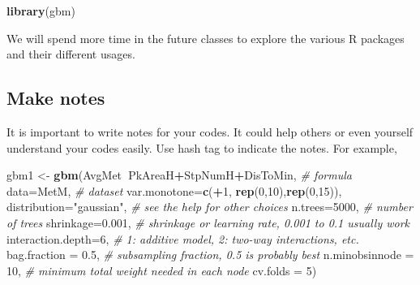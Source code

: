 \documentclass[]{book}
\newenvironment{Shaded}{\begin{snugshade}}{\end{snugshade}}
\newcommand{\CommentTok}[1]{\textcolor[rgb]{0.56,0.35,0.01}{\textit{#1}}}
\newcommand{\DataTypeTok}[1]{\textcolor[rgb]{0.13,0.29,0.53}{#1}}
\newcommand{\DecValTok}[1]{\textcolor[rgb]{0.00,0.00,0.81}{#1}}
\newcommand{\FloatTok}[1]{\textcolor[rgb]{0.00,0.00,0.81}{#1}}
\newcommand{\KeywordTok}[1]{\textcolor[rgb]{0.13,0.29,0.53}{\textbf{#1}}}
\newcommand{\NormalTok}[1]{#1}
\newcommand{\OperatorTok}[1]{\textcolor[rgb]{0.81,0.36,0.00}{\textbf{#1}}}
\newcommand{\StringTok}[1]{\textcolor[rgb]{0.31,0.60,0.02}{#1}}
\begin{document}
\begin{Shaded}
\begin{Highlighting}[]
\KeywordTok{library}\NormalTok{(gbm)}
\end{Highlighting}
\end{Shaded}

We will spend more time in the future classes to explore the various R packages and their different usages.

\hypertarget{make-notes}{%
\subsection{Make notes}\label{make-notes}}

It is important to write notes for your codes. It could help others or even yourself understand your codes easily. Use hash tag to indicate the notes. For example,

\begin{Shaded}
\begin{Highlighting}[]
\NormalTok{gbm1 <-}\StringTok{ }\KeywordTok{gbm}\NormalTok{(AvgMet}\OperatorTok{~}\NormalTok{PkAreaH}\OperatorTok{+}\NormalTok{StpNumH}\OperatorTok{+}\NormalTok{DisToMin,  }\CommentTok{# formula}
            \DataTypeTok{data=}\NormalTok{MetM,                        }\CommentTok{# dataset  }
            \DataTypeTok{var.monotone=}\KeywordTok{c}\NormalTok{(}\OperatorTok{+}\DecValTok{1}\NormalTok{, }\KeywordTok{rep}\NormalTok{(}\DecValTok{0}\NormalTok{,}\DecValTok{10}\NormalTok{),}\KeywordTok{rep}\NormalTok{(}\DecValTok{0}\NormalTok{,}\DecValTok{15}\NormalTok{)), }
            \DataTypeTok{distribution=}\StringTok{"gaussian"}\NormalTok{,          }\CommentTok{# see the help for other choices  }
            \DataTypeTok{n.trees=}\DecValTok{5000}\NormalTok{,                     }\CommentTok{# number of trees  }
            \DataTypeTok{shrinkage=}\FloatTok{0.001}\NormalTok{,                  }\CommentTok{# shrinkage or learning rate, 0.001 to 0.1 usually work  }
            \DataTypeTok{interaction.depth=}\DecValTok{6}\NormalTok{,              }\CommentTok{# 1: additive model, 2: two-way interactions, etc.  }
            \DataTypeTok{bag.fraction =} \FloatTok{0.5}\NormalTok{,               }\CommentTok{# subsampling fraction, 0.5 is probably best  }
            \DataTypeTok{n.minobsinnode =} \DecValTok{10}\NormalTok{,              }\CommentTok{# minimum total weight needed in each node}
            \DataTypeTok{cv.folds =} \DecValTok{5}\NormalTok{)}
\end{Highlighting}
\end{Shaded}
\end{document}
